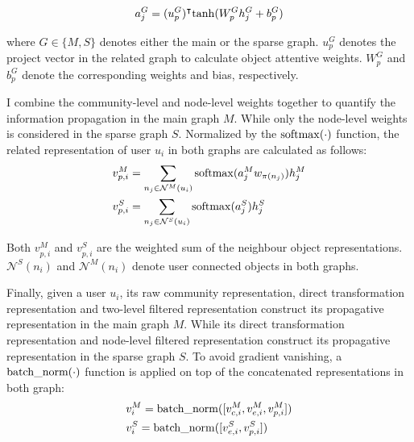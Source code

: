 \begin{equation} \label{eq:np}
a_{j}^{G} = (u_p^{G})^{\intercal} {\rm tanh}(W^{G}_p h_{j}^{G} +b_p^{G})
\end{equation}

where $G \in\{M,S\}$ denotes either the main or the sparse graph. $u^{G}_p$ denotes the project vector in the related graph to calculate object attentive weights. $W_p^{G}$ and $b_p^{G}$ denote the corresponding weights and bias, respectively. 

I combine the community-level and node-level weights together to quantify the information propagation in the main graph $M$. While only the node-level weights is considered in the sparse graph $S$. Normalized by the ${\rm softmax}(\cdot)$ function, the related representation of  user $u_i$ in both graphs are calculated as follows:
\begin{equation}\label{eq:pv}
\begin{aligned} 
& v_{p,i}^{M} = \sum_{n_j \in \mathcal{N}^{M}(u_i)} {\rm softmax}(a_{j}^{M} w_{\pi(n_j)})  h_{j}^{M} \\
& v_{p,i}^{S} = \sum_{n_j \in \mathcal{N}^{S}(u_i)}{\rm softmax}(a_{j}^{S}) h_{j}^{S} 
\end{aligned} 
\end{equation}

Both $v_{p,i}^{M}$ and $v_{p,i}^{S}$ are the weighted sum of the neighbour object representations. $\mathcal{N}^{S}(n_i)$ and $\mathcal{N}^{M}(n_i)$ denote user connected objects in both graphs. 

Finally, given a user $u_i$, its raw community representation, direct transformation representation and two-level filtered representation construct its propagative representation in the main graph $M$. While its direct transformation representation and node-level filtered representation construct its propagative representation in the sparse graph $S$. To avoid gradient vanishing, a ${\rm batch\_norm(\cdot)}$ function is applied on top of the concatenated representations in both graph:
\begin{equation} \label{eq:nv}
\begin{aligned} 
& v_{i}^{M} = {\rm batch\_norm}([v_{c,i}^{M},v_{e,i}^{M},v_{p,i}^{M}]) \\
& v_{i}^{S} = {\rm batch\_norm}( [v_{e,i}^{S},v_{p,i}^{S}])
\end{aligned} 
\end{equation} 

